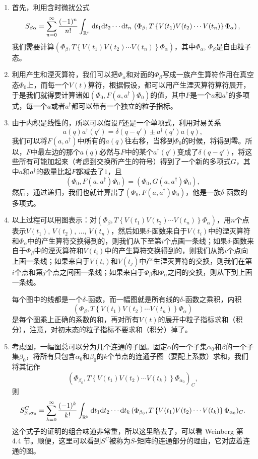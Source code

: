 \documentclass[11pt]{article}
\theoremstyle{definition}
\theoremstyle{plain}
\begin{document}
\begin{enumerate}
\item 首先，利用含时微扰公式
\[
	S_{\beta\alpha}=\sum_{n=0}^{\infty}\frac{(-1)^n}{n!}\int_{\mathbb{R}^n}\mathrm{d} t_1\mathrm{d} t_2\cdots\mathrm{d} t_n\, \left(\Phi_\beta,T\left\{V(t_1)V(t_2)\cdots V(t_n)\right\}\Phi_\alpha\right),
\]
我们需要计算$\left(\Phi_\beta,T\left\{V(t_1)V(t_2)\cdots V(t_n)\right\}\Phi_\alpha\right)$，其中$\Phi_{\alpha}$, $\Phi_\beta$是自由粒子态。
\item 利用产生和湮灭算符，我们可以把$\Phi_{\alpha}$和对面的$\Phi_\beta$写成一族产生算符作用在真空态$\Phi_0$上，而每一个$V(t)$算符，根据假设，都可以用产生湮灭算符算符展开，于是我们就得要计算诸如$(\Phi_0,F(a,a^\dag)\Phi_0)$的值，其中$F$是一个$a$和$a^\dag$的多项式，每一个$a$或者$a^\dag$都可以带有一个独立的粒子指标。

\item 由于内积是线性的，所以可以假设$F$还是一个单项式，利用对易关系
\[
	a(q)a^\dag(q')=\delta(q-q')\pm a^\dag(q')a(q),
\]
我们可以将$F(a,a^\dag)$中所有的$a(q)$往右移，当移到$\Phi_0$的时候，将得到零。所以，$F$中最左边的那个$a(q)$必然与$F$中的某个$a^\dag(q')$变成了$\delta(q-q')$，将这些所有可能加起来（考虑到交换所产生的符号）得到了一个新的多项式$G$，其中$a$和$a^\dag$的数量比起$F$都减去了$1$，且
\[
	(\Phi_0,F(a,a^\dag)\Phi_0)=(\Phi_0,G(a,a^\dag)\Phi_0),
\]
然后，通过递归，我们也就计算出了$(\Phi_0,F(a,a^\dag)\Phi_0)$，他是一族$\delta$-函数的多项式。

\item 以上过程可以用图表示：对$\left(\Phi_\beta,T\left\{V(t_1)V(t_2)\cdots V(t_n)\right\}\Phi_\alpha\right)$，用$n$个点表示$V(t_1)$, $V(t_2)$, $\dots$, $V(t_n)$，然后如果$\delta$-函数来自于$V(t_i)$中的湮灭算符和$\Phi_\alpha$中的产生算符交换得到的，则我们从下至第$i$个点画一条线；如果$\delta$-函数来自于$\Phi_\beta$中的湮灭算符和$V(t_i)$中的产生算符交换得到的，则我们从第$i$个点向上画一条线；如果来自于$V(t_i)$和$V(t_j)$中产生湮灭算符的交换，则我们在第$i$个点和第$j$个点之间画一条线；如果来自于$\Phi_\beta$和$\Phi_\alpha$之间的交换，则从下到上画一条线。

每个图中的线都是一个$\delta$-函数，而一幅图就是所有线的$\delta$-函数之乘积，内积
\[
\left(\Phi_\beta,T\left\{V(t_1)V(t_2)\cdots V(t_n)\right\}\Phi_\alpha\right)
\]
是每个图乘上正确的系数的和，再对所有$V(t)$的展开中粒子指标求和（积分），注意，对初末态的粒子指标不要求和（积分）掉了。

\item 考虑图，一幅图总可以分为几个连通的子图。固定$\alpha$的一个子集$\alpha_0$和$\beta$的一个子集$\beta_0$，将所有只包含$\alpha_0$和$\beta_0$的$k$个节点的连通子图（要配上系数）求和，我们将其记作
\[
	(\Phi_{\beta_0},T\left\{V(t_1)V(t_2)\cdots V(t_k)\right\}\Phi_{\alpha_0})_C,
\]
则
\[
	S^{C}_{\beta_0\alpha_0}=\sum_{k=0}^{\infty}\frac{(-1)^k}{k!}\int_{\mathbb{R}^k}\mathrm{d} t_1\mathrm{d} t_2\cdots\mathrm{d} t_k\, (\Phi_{\beta_0},T\left\{V(t_1)V(t_2)\cdots V(t_k)\right\}\Phi_{\alpha_0})_C.
\]
这个式子的证明的组合味道非常重，所以这里略去了，可以看 Weinberg 第 4.4 节。顺便，这里可以看到$S^C$被称为$S$-矩阵的连通部分的理由，它对应着连通的图。


\end{enumerate}
\end{document}
